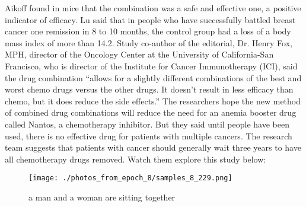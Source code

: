 \documentclass{article}%
\begin{document}
Aikoff found in mice that the combination was a safe and effective one, a positive indicator of efficacy. Lu said that in people who have successfully battled breast cancer one remission in 8 to 10 months, the control group had a loss of a body mass index of more than 14.2.\newline%
Study co{-}author of the editorial, Dr. Henry Fox, MPH, director of the Oncology Center at the University of California{-}San Francisco, who is director of the Institute for Cancer Immunotherapy (ICI), said the drug combination “allows for a slightly different combinations of the best and worst chemo drugs versus the other drugs. It doesn’t result in less efficacy than chemo, but it does reduce the side effects.”\newline%
The researchers hope the new method of combined drug combinations will reduce the need for an anemia booster drug called Nantos, a chemotherapy inhibitor. But they said until people have been used, there is no effective drug for patients with multiple cancers.\newline%
The research team suggests that patients with cancer should generally wait three years to have all chemotherapy drugs removed.\newline%
Watch them explore this study below:\newline%

%


\begin{figure}[h!]%
\centering%
\texttt{[image: ./photos\_from\_epoch\_8/samples\_8\_229.png]}%
\caption{a man and a woman are sitting together}%
\end{figure}

%
\end{document}
